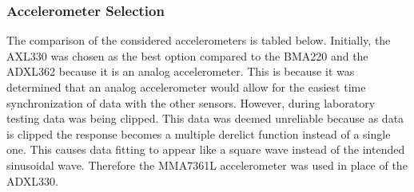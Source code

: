 \subsubsection{Accelerometer Selection}
\indent The comparison of the considered accelerometers is tabled below.  Initially, the AXL330 was chosen as the best option compared to the BMA220 and the ADXL362 because it is an analog accelerometer.  This is because it was determined that an analog accelerometer would allow for the easiest time synchronization of data with the other sensors.  However, during laboratory testing data was being clipped.  This data was deemed unreliable because as data is clipped the response becomes a multiple derelict function instead of a single one.  This causes data fitting to appear like a square wave instead of the intended sinusoidal wave.  Therefore the MMA7361L accelerometer was used in place of the ADXL330.  

